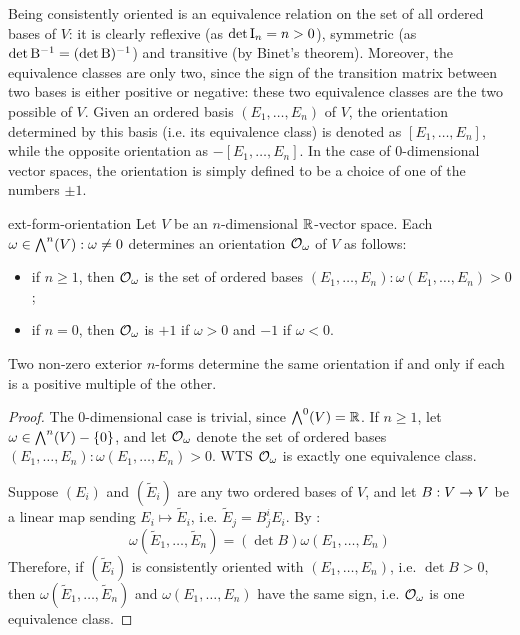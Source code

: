 Being consistently oriented is an equivalence relation on the set of all ordered bases of $ V $: it is clearly reflexive (as $ \det \mathrm{I}_n = n > 0 $), symmetric (as $ \det \mathrm{B}^{-1} = (\det \mathrm{B})^{-1} $) and transitive (by Binet's theorem). Moreover, the equivalence classes are only two, since the sign of the transition matrix between two bases is either positive or negative: these two equivalence classes are the two possible  of $ V $. Given an ordered basis $ (E_1 , \dots , E_n) $ of $ V $, the orientation determined by this basis (i.e. its equivalence class) is denoted as $ [E_1 , \dots , E_n] $, while the opposite orientation as $ - [E_1 , \dots , E_n] $. In the case of $ 0 $-dimensional vector spaces, the orientation is simply defined to be a choice of one of the numbers $ \pm 1 $.

\begin{proposition}{}{ext-form-orientation}
  Let $ V $ be an $ n $-dimensional $ \mathbb{R} $-vector space. Each $ \omega \in {\bigwedge}^{n}(V) : \omega \neq 0 $ determines an orientation $ \mathcal{O}_\omega $ of $ V $ as follows:
  \begin{itemize}
    \item if $ n \geq 1 $, then $ \mathcal{O}_\omega $ is the set of ordered bases $ (E_1 , \dots , E_n) : \omega(E_1 , \dots , E_n) > 0 $;
    \item if $ n = 0 $, then $ \mathcal{O}_\omega $ is $ +1 $ if $ \omega > 0 $ and $ -1 $ if $ \omega < 0 $.
  \end{itemize}
  Two non-zero exterior $ n $-forms determine the same orientation if and only if each is a positive multiple of the other.
\end{proposition}

\begin{proofbox}
  \begin{proof}
    The $ 0 $-dimensional case is trivial, since $ {\bigwedge}^{0}(V) = \mathbb{R} $. If $ n \geq 1 $, let $ \omega \in {\bigwedge}^{n}(V) - \{0\} $, and let $ \mathcal{O}_\omega $ denote the set of ordered bases $ (E_1 , \dots , E_n) : \omega(E_1 , \dots , E_n) > 0 $. WTS $ \mathcal{O}_\omega $ is exactly one equivalence class.

    Suppose $ (E_i) $ and $ (\tilde{E}_i) $ are any two ordered bases of $ V $, and let $ B : V \rightarrow V $ be a linear map sending $ E_i \mapsto \tilde{E}_i $, i.e. $ \tilde{E}_j = B^i_j E_i $. By :
    \begin{equation*}
      \omega(\tilde{E}_1 , \dots , \tilde{E}_n) = (\det B) \omega(E_1 , \dots , E_n)
    \end{equation*}
    Therefore, if $ (\tilde{E}_i) $ is consistently oriented with $ (E_1 , \dots , E_n) $, i.e. $ \det B > 0 $, then $ \omega(\tilde{E}_1 , \dots , \tilde{E}_n) $ and $ \omega(E_1 , \dots , E_n) $ have the same sign, i.e. $ \mathcal{O}_\omega $ is one equivalence class.
  \end{proof}
\end{proofbox}

